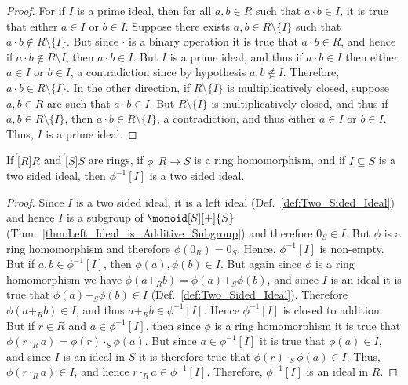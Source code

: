 \documentclass{article}                                                        %
\begin{document}
        \begin{proof}
            For if $I$ is a prime ideal, then for all $a,b\in{R}$ such that
            $a\cdot{b}\in{I}$, it is true that either $a\in{I}$ or $b\in{I}$.
            Suppose there exists $a,b\in{R}\setminus\{I\}$ such that
            $a\cdot{b}\notin{R}\setminus\{I\}$. But since $\cdot$ is a binary
            operation it is true that $a\cdot{b}\in{R}$, and hence if
            $a\cdot{b}\notin{R}\setminus{I}$, then $a\cdot{b}\in{I}$. But $I$ is
            a prime ideal, and thus if $a\cdot{b}\in{I}$ then either $a\in{I}$
            or $b\in{I}$, a contradiction since by hypothesis $a,b\notin{I}$.
            Therefore, $a\cdot{b}\in{R}\setminus\{I\}$. In the other direction,
            if $R\setminus\{I\}$ is multiplicatively closed, suppose $a,b\in{R}$
            are such that $a\cdot{b}\in{I}$. But $R\setminus\{I\}$ is
            multiplicatively closed, and thus if $a,b\in{R}\setminus\{I\}$, then
            $a\cdot{b}\in{R}\setminus\{I\}$, a contradiction, and thus either
            $a\in{I}$ or $b\in{I}$. Thus, $I$ is a prime ideal.
        \end{proof}
        \begin{theorem}
            \label{thm:homo_pre_image_of_ideal_is_ideal}%
            If $\ring[R]{R}$ and $\ring[S]{S}$ are rings, if
            $\phi:R\rightarrow{S}$ is a ring homomorphism, and if
            $I\subseteq{S}$ is a two sided ideal, then $\phi^{\minus{1}}[I]$ is
            a two sided ideal.
        \end{theorem}
        \begin{proof}
            Since $I$ is a two sided ideal, it is a left ideal
            (Def.~\ref{def:Two_Sided_Ideal}) and hence $I$ is a subgroup of
            $\monoid[S][+]{S}$
            (Thm.~\ref{thm:Left_Ideal_is_Additive_Subgroup}) and therefore
            $0_{S}\in{I}$. But $\phi$ is a ring homomorphism and therefore
            $\phi(0_{R})=0_{S}$. Hence, $\phi^{\minus{1}}[I]$ is non-empty. But
            if $a,b\in\phi^{\minus{1}}[I]$, then $\phi(a),\phi(b)\in{I}$. But
            again since $\phi$ is a ring homomorphism we have
            $\phi(a+_{R}b)=\phi(a)+_{S}\phi(b)$, and since $I$ is an ideal it is
            true that $\phi(a)+_{S}\phi(b)\in{I}$
            (Def.~\ref{def:Two_Sided_Ideal}). Therefore $\phi(a+_{R}b)\in{I}$,
            and thus $a+_{R}b\in\phi^{\minus{1}}[I]$. Hence
            $\phi^{\minus{1}}[I]$ is closed to addition. But if $r\in{R}$ and
            $a\in\phi^{\minus{1}}[I]$, then since $\phi$ is a ring homomorphism
            it is true that $\phi(r\cdot_{R}a)=\phi(r)\cdot_{S}\phi(a)$. But
            since $a\in\phi^{\minus{1}}[I]$ it is true that $\phi(a)\in{I}$, and
            since $I$ is an ideal in $S$ it is therefore true that
            $\phi(r)\cdot_{S}\phi(a)\in{I}$. Thus, $\phi(r\cdot_{R}a)\in{I}$,
            and hence $r\cdot_{R}a\in\phi^{\minus{1}}[I]$. Therefore,
            $\phi^{\minus{1}}[I]$ is an ideal in $R$.
        \end{proof}
\end{document}
